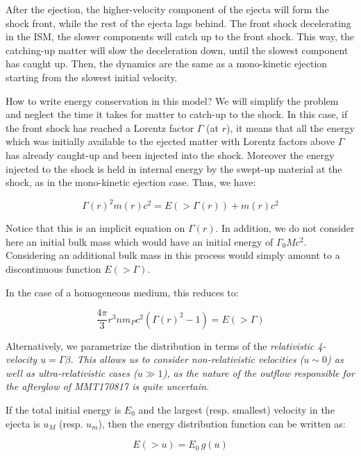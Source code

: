After the ejection, the higher-velocity component of the ejecta will form the shock front, while the rest of the ejecta lags behind. The front shock decelerating in the ISM, the slower components will catch up to the front shock. This way, the catching-up matter will slow the deceleration down, until the slowest component has caught up. Then, the dynamics are the same as a mono-kinetic ejection starting from the slowest initial velocity.

How to write energy conservation in this model? We will simplify the problem and neglect the time it takes for matter to catch-up to the shock. In this case, if the front shock has reached a Lorentz factor $\Gamma$ (at $r$), it means that all the energy which was initially available to the ejected matter with Lorentz factors above $\Gamma$ has already caught-up and been injected into the shock. Moreover the energy injected to the shock is held in internal energy by the swept-up material at the shock, as in the mono-kinetic ejection case. Thus, we have:

\begin{equation} \Gamma(r)^2 m(r) c ^ 2 = E( > \Gamma(r)) + m(r) c ^ 2\end{equation}

Notice that this is an implicit equation on $\Gamma(r)$. In addition, we do not consider here an initial bulk mass which would have an initial energy of $\Gamma_0 M c^2$. Considering an additional bulk mass in this process would simply amount to a discontinuous function $ E( > \Gamma)$.

In the case of a homogeneous medium, this reduces to:

\begin{equation}\frac{4\pi}{3}r^3 n m_P c^2(\Gamma(r)^2 - 1) = E( > \Gamma) \end{equation}


Alternatively, we parametrize the distribution in terms of the \it{relativistic 4-velocity} $u = \Gamma \beta$. This allows us to consider non-relativistic velocities ($u \sim 0$) as well as ultra-relativistic cases ($u \gg 1$), as the nature of the outflow responsible for the afterglow of MMT170817 is quite uncertain.

If the total initial energy is $E_0$ and the largest (resp. smallest) velocity in the ejecta is $u_M$ (resp. $u_m$), then the energy distribution function can be written as:

\begin{equation} E( > u) = E_0\, g(u) \end{equation}

